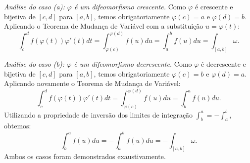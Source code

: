 {	\textit{Análise do caso (a): $\varphi$ é um difeomorfismo crescente.}
	Como $\varphi$ é crescente e bijetiva de $[c,d]$ para $[a,b]$, temos obrigatoriamente $\varphi(c) = a$ e $\varphi(d) = b$. Aplicando o Teorema de Mudança de Variável com a substituição $u = \varphi(t)$:
	\begin{equation*}
		\int_c^d f(\varphi(t)) \varphi'(t) dt = \int_{\varphi(c)}^{\varphi(d)} f(u) du = \int_a^b f(u) du = \int_{[a,b]} \omega.
	\end{equation*}
	
	\textit{Análise do caso (b): $\varphi$ é um difeomorfismo decrescente.}
	Como $\varphi$ é decrescente e bijetiva de $[c,d]$ para $[a,b]$, temos obrigatoriamente $\varphi(c) = b$ e $\varphi(d) = a$. Aplicando novamente o Teorema de Mudança de Variável:
	\begin{equation*}
		\int_c^d f(\varphi(t)) \varphi'(t) dt = \int_{\varphi(c)}^{\varphi(d)} f(u) du = \int_b^a f(u) du.
	\end{equation*}
	Utilizando a propriedade de inversão dos limites de integração $\int_b^a = -\int_a^b$, obtemos:
	\begin{equation*}
		\int_b^a f(u) du = - \int_a^b f(u) du = - \int_{[a,b]} \omega.
	\end{equation*}
	Ambos os casos foram demonstrados exaustivamente.
}


